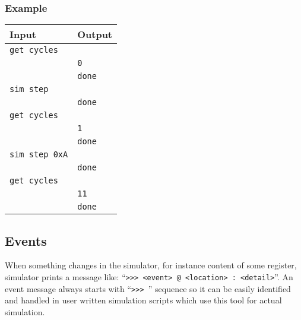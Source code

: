         \subsubsection{Example}
            \begin{tabular}{l|l}
                \textbf{Input}          & \textbf{Output} \\
                \hline
                \verb'get cycles'       & \\
                                        & \verb'0'\\
                                        & \verb'done'\\
                \hline
                \verb'sim step'         & \\
                                        & \verb'done'\\
                \hline
                \verb'get cycles'       & \\
                                        & \verb'1'\\
                                        & \verb'done'\\
                \hline
                \verb'sim step 0xA'     & \\
                                        & \verb'done'\\
                \hline
                \verb'get cycles'       & \\
                                        & \verb'11'\\
                                        & \verb'done'\\
            \end{tabular}

    \subsection{Events}
        When something changes in the simulator, for instance content of some register, simulator prints a message like: ``\texttt{>{}>{}>~<event>~@~<location>~:~<detail>}''. An event message always starts with ``\texttt{>{}>{}> }'' sequence so it can be easily identified and handled in user written simulation scripts which use this tool for actual simulation.

